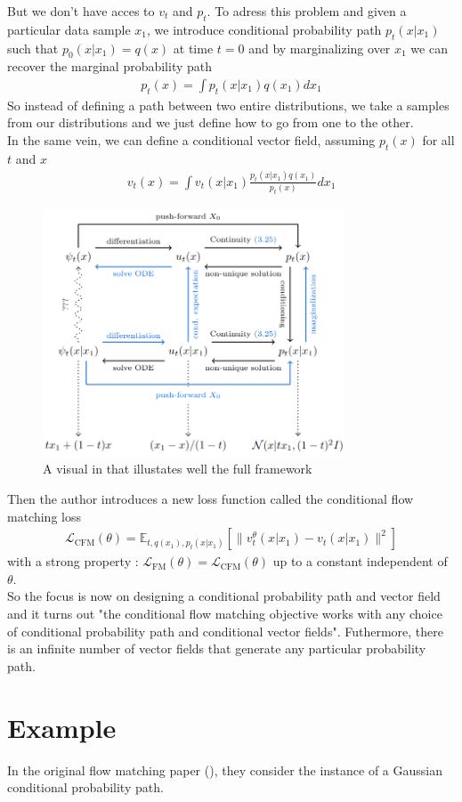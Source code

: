 \documentclass[a4paper,12pt]{article}
\begin{document}
But we don't have acces to \(v_t\) and \(p_t\). To adress this problem and given a particular data sample \(x_1\), we introduce conditional probability path \(p_t(x|x_1)\) such that \(p_0(x|x_1)=q(x)\) at time \(t=0\) and by marginalizing over \(x_1\) we can recover the marginal probability path  
\begin{align}
  p_t(x)=\int p_t(x|x_1)q(x_1)dx_1
\end{align}
So instead of defining a path between two entire distributions, we take a samples from our distributions and we just define how to go from one to the other.\\ 
In the same vein, we can define a conditional vector field, assuming \(p_t(x)\) for all \(t\) and \(x\) 
\begin{align}
  v_t(x)=\int v_t(x|x_1)\frac{p_t(x|x_1)q(x_1)}{p_t(x)}dx_1
\end{align}

\begin{figure}[h]
  \centering
  \includegraphics[width=0.8\textwidth]{FlowMatchingFramework.png}
  \caption{A visual in \cite{lipman2024flowmatchingguidecode} that illustates well the full framework}
  \label{fig:flow_matching_framework}
\end{figure}

Then the author introduces a new loss function called the conditional flow matching loss
\begin{align}
  \mathcal{L}_\text{CFM}(\theta) = \mathbb{E}_{t,q(x_1),p_t(x|x_1)}\left[\|v_t^\theta(x|x_1)-v_t(x|x_1)\|^2\right]
\end{align}
with a strong property : \(\mathcal{L}_\text{FM}(\theta)=\mathcal{L}_\text{CFM}(\theta)\) up to a constant independent of \(\theta\). \\
So the focus is now on designing a conditional probability path and vector field and it turns out "the conditional flow matching objective works with any choice of conditional probability path and conditional vector fields". Futhermore, there is an infinite number of vector fields that generate any particular probability path.\\



\section{Example}
In the original flow matching paper (\cite{lipman2023flowmatchinggenerativemodeling}), they consider the instance of a Gaussian conditional probability path.




\end{document}
